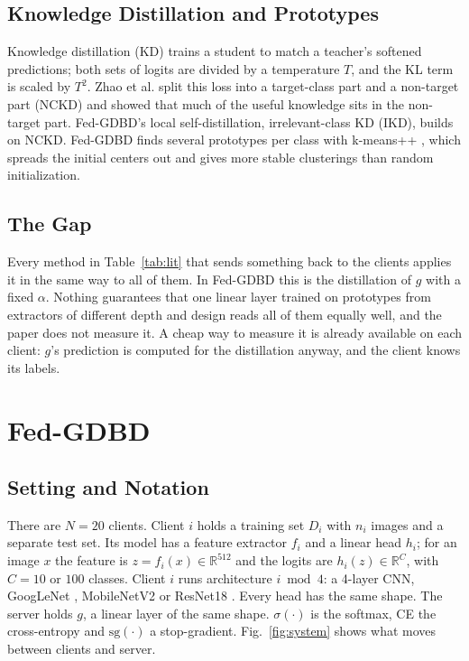 \documentclass[conference]{IEEEtran}
\begin{document}
\subsection{Knowledge Distillation and Prototypes}
Knowledge distillation (KD) \cite{hinton2015kd} trains a student to match a teacher's softened predictions; both sets of logits are divided by a temperature $T$, and the KL term is scaled by $T^2$. Zhao et al. \cite{zhao2022dkd} split this loss into a target-class part and a non-target part (NCKD) and showed that much of the useful knowledge sits in the non-target part. Fed-GDBD's local self-distillation, irrelevant-class KD (IKD), builds on NCKD. Fed-GDBD finds several prototypes per class with k-means++ \cite{arthur2007kmeanspp}, which spreads the initial centers out and gives more stable clusterings than random initialization.

\subsection{The Gap}
Every method in Table~\ref{tab:lit} that sends something back to the clients applies it in the same way to all of them. In Fed-GDBD this is the distillation of $g$ with a fixed $\alpha$. Nothing guarantees that one linear layer trained on prototypes from extractors of different depth and design reads all of them equally well, and the paper does not measure it. A cheap way to measure it is already available on each client: $g$'s prediction is computed for the distillation anyway, and the client knows its labels.

\section{Fed-GDBD}
\label{sec:method}

\subsection{Setting and Notation}
There are $N=20$ clients. Client $i$ holds a training set $D_i$ with $n_i$ images and a separate test set. Its model has a feature extractor $f_i$ and a linear head $h_i$; for an image $x$ the feature is $z=f_i(x)\in\mathbb{R}^{512}$ and the logits are $h_i(z)\in\mathbb{R}^C$, with $C=10$ or $100$ classes. Client $i$ runs architecture $i \bmod 4$: a 4-layer CNN, GoogLeNet \cite{szegedy2015googlenet}, MobileNetV2 \cite{sandler2018mobilenetv2} or ResNet18 \cite{he2016resnet}. Every head has the same shape. The server holds $g$, a linear layer of the same shape. $\sigma(\cdot)$ is the softmax, CE the cross-entropy and $\mathrm{sg}(\cdot)$ a stop-gradient. Fig.~\ref{fig:system} shows what moves between clients and server.
\end{document}
